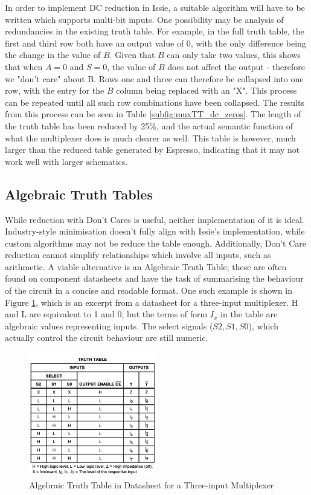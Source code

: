 In order to implement DC reduction in Issie, a suitable algorithm will have to be written which supports multi-bit inputs. One possibility may be analysis of redundancies in the existing truth table. For example, in the full truth table, the first and third row both have an output value of 0, with the only difference being the change in the value of $B$. Given that $B$ can only take two values, this shows that when $A=0$ and $S=0$, the value of $B$ does not affect the output - therefore we "don't care" about B. Rows one and three can therefore be collapsed into one row, with the entry for the $B$ column being replaced with an "X". This process can be repeated until all such row combinations have been collapsed. The results from this process can be seen in Table \ref{subfig:muxTT_dc_zeros}. The length of the truth table has been reduced by 25\%, and the actual semantic function of what the multiplexer does is much clearer as well. This table is however, much larger than the reduced table generated by Espresso, indicating that it may not work well with larger schematics.

\subsection{Algebraic Truth Tables}
While reduction with Don't Cares is useful, neither implementation of it is ideal. Industry-style minimisation doesn't fully align with Issie's implementation, while custom algorithms may not be reduce the table enough. Additionally, Don't Care reduction cannot simplify relationships which involve all inputs, such as arithmetic. A viable alternative is an Algebraic Truth Table; these are often found on component datasheets \cite{timux} and have the task of summarising the behaviour of the circuit in a concise and readable format.  One such example is shown in Figure \ref{fig:datasheet}, which is an excerpt from a datasheet for a three-input multiplexer. H and L are equivalent to 1 and 0, but the terms of form $I_x$ in the table are algebraic values representing inputs. The select signals ($S2,S1,S0$), which actually control the circuit behaviour are still numeric.

\begin{figure}[h]
    \centering
    \includegraphics[width=0.5\textwidth]{02.Background/datasheet.png}
    \caption{Algebraic Truth Table in Datasheet for a Three-input Multiplexer \cite{timux}}
    \label{fig:datasheet}
\end{figure}

